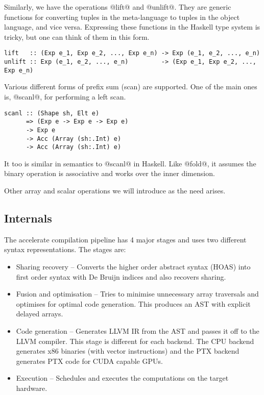 Similarly, we have the operations @lift@ and @unlift@. They are generic functions for converting tuples in the meta-language to tuples in the object language, and vice versa. Expressing these functions in the Haskell type system is tricky, but one can think of them in this form.
%
\begin{lstlisting}[style=ndp]
lift   :: (Exp e_1, Exp e_2, ..., Exp e_n) -> Exp (e_1, e_2, ..., e_n)
unlift :: Exp (e_1, e_2, ..., e_n)         -> (Exp e_1, Exp e_2, ..., Exp e_n)
\end{lstlisting}
%

Various different forms of prefix sum (scan) are supported. One of the main ones is, @scanl@, for performing a left scan.
%
\begin{lstlisting}
scanl :: (Shape sh, Elt e)
      => (Exp e -> Exp e -> Exp e)
      -> Exp e
      -> Acc (Array (sh:.Int) e)
      -> Acc (Array (sh:.Int) e)
\end{lstlisting}
%
It too is similar in semantics to @scanl@ in Haskell. Like @fold@, it assumes the binary operation is associative and works over the inner dimension.

Other array and scalar operations we will introduce as the need arises.


\subsection{Internals}
\label{sec:acc-internals}

The accelerate compilation pipeline has 4 major stages and uses two different syntax representations. The stages are:
%
\begin{itemize}
%
\item Sharing recovery -- Converts the higher order abstract syntax (HOAS) into first order syntax with De Bruijn indices and also recovers sharing.
%
%
\item Fusion and optimisation -- Tries to minimise unnecessary array traversals and optimises for optimal code generation. This produces an AST with explicit delayed arrays.
%
\item Code generation -- Generates LLVM IR from the AST and passes it off to the LLVM compiler. This stage is different for each backend. The CPU backend generates x86 binaries (with vector instructions) and the PTX backend generates PTX code for CUDA capable GPUs.
%
\item Execution -- Schedules and executes the computations on the target hardware.
\end{itemize}
%

